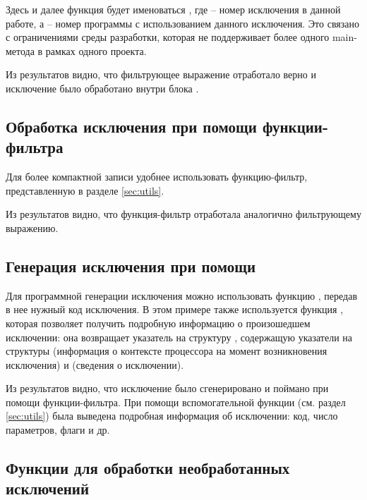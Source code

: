 Здесь и далее функция  будет именоваться , где  -- номер исключения в данной работе, а  -- номер программы с использованием данного исключения. Это связано с ограничениями среды разработки, которая не поддерживает более одного main-метода в рамках одного проекта.


Из результатов видно, что фильтрующее выражение отработало верно и исключение было обработано внутри блока .

\subsection{Обработка исключения при помощи функции-фильтра}

Для более компактной записи удобнее использовать функцию-фильтр, представленную в разделе \ref{sec:utils}.


Из результатов видно, что функция-фильтр отработала аналогично фильтрующему выражению.

\subsection{Генерация исключения при помощи }

Для программной генерации исключения можно использовать функцию , передав в нее нужный код исключения. В этом примере также используется функция , которая позволяет получить подробную информацию о произошедшем исключении: она возвращает указатель на
структуру , содержащую указатели на структуры  (информация о контексте процессора на момент возникновения исключения) и  (сведения о исключении).


Из результатов видно, что исключение было сгенерировано и поймано при помощи функции-фильтра. При помощи вспомогательной функции  (см. раздел \ref{sec:utils}) была выведена подробная информация об исключении: код, число параметров, флаги и др.

\subsection{Функции для обработки необработанных исключений}

